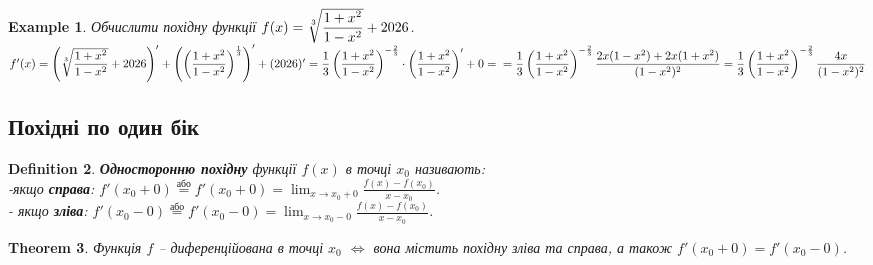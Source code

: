 \documentclass[a4paper, 14pt]{article}
\theoremstyle{theoremdd}
\newtheorem{theorem}{Theorem}[subsection]
\theoremstyle{theoremdd}
\newtheorem{definition}[theorem]{Definition}
\theoremstyle{theoremdd}
\theoremstyle{theoremdd}
\newtheorem{example}[theorem]{Example}
\theoremstyle{theoremdd}
\theoremstyle{theoremdd}
\theoremstyle{theoremdd}
\theoremstyle{theoremdd}
\begin{document}
\iffalse
Тут треба більш детально про $f(x) = \ln(x+\sqrt{1+x^2})$ сказати.\\
Розглянемо рівняння $\sh x = y$.\\
Розв'яжемо її відносно $x$.\\
$\displaystyle \dfrac{e^x-e^{-x}}{2} = y \Rightarrow e^x-e^{-x}=2y \Rightarrow e^{2x}- 2y e^x - 1 = 0$\\
$\Rightarrow e^x = y \pm \sqrt{1+y^2} \Rightarrow e^x = y + \sqrt{1+y^2}$\\
$\Rightarrow x = \ln(y + \sqrt{1+y^2})$\\
Таким чином, можна стверджувати, що $\ln(y+\sqrt{1+y^2}) = \textrm{arcsh } y$.\\
Але найбільше застосування все ж таки виявляється згодом (коли підуть інтеграли).
\fi

\begin{example} Обчислити похідну функції $f(x) = \sqrt[3]{\dfrac{1+x^2}{1-x^2}} + \the\year$.\\
$f'(x) = \left( \sqrt[3]{\dfrac{1+x^2}{1-x^2}} + \the\year \right)' + \left(\left( \dfrac{1+x^2}{1-x^2} \right)^{\frac{1}{3}} \right)' + (\the\year)' = \dfrac{1}{3} \left( \dfrac{1+x^2}{1-x^2} \right)^{-\frac{2}{3}} \cdot \left( \dfrac{1+x^2}{1-x^2} \right)' + 0 = \\ = \dfrac{1}{3} \left( \dfrac{1+x^2}{1-x^2} \right)^{-\frac{2}{3}} \dfrac{2x(1-x^2)+2x(1+x^2)}{(1-x^2)^2} = \dfrac{1}{3} \left( \dfrac{1+x^2}{1-x^2} \right)^{-\frac{2}{3}} \dfrac{4x}{(1-x^2)^2}$
\end{example}

\subsection{Похідні по один бік}
\begin{definition}
\textbf{Односторонню похідну} функції $f(x)$ в точці $x_0$ називають:\\
-якщо \textbf{справа}: $\displaystyle f'(x_0+0) \overset{\text{або}}{=} f'(x_0+0) = \lim_{x \to x_0+0} \frac{f(x)-f(x_0)}{x-x_0}$.\\
- якщо \textbf{зліва}: $\displaystyle f'(x_0-0) \overset{\text{або}}{=} f'(x_0-0) = \lim_{x \to x_0-0} \frac{f(x)-f(x_0)}{x-x_0}$.
\end{definition}

\begin{theorem}
Функція $f$ -- диференційована в точці $x_0$ $\iff$ вона містить похідну зліва та справа, а також $f'(x_0+0) = f'(x_0-0)$.
\end{theorem}
\end{document}
